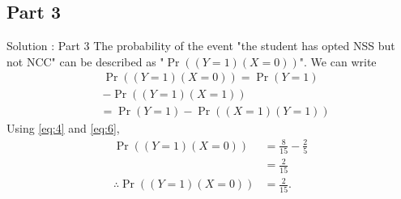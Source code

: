 \documentclass{beamer}
\providecommand{\pr}[1]{\ensuremath{\Pr\left(#1\right)}}
\providecommand{\brak}[1]{\ensuremath{\left(#1\right)}}
\begin{document}
\subsection{Part 3}

\begin{frame}{Solution : Part 3}
       The probability of the event "the student has opted NSS but not NCC" can be described as  "$ \pr{\brak{Y=1}\brak{ X = 0}}$". 
                We can write 
          \begin{equation}
             \begin{split}
                \pr{\brak{Y=1}\brak{ X = 0}} = \pr{Y = 1} \\
                                                  - \pr{\brak{Y = 1}\brak{X = 1}}
             \end{split}
          \end{equation}
          \begin{align}
                            &= \pr{Y = 1} -  \pr{\brak{X = 1}\brak{Y=1}}
          \end{align}
       Using \eqref{eq:4} and \eqref{eq:6},
          \begin{align}
	        \pr{\brak{Y=1}\brak{ X = 0}}  &= \frac{8}{15} -  \frac{2}{5}\\
                                              & = \frac{2}{15}\\
                \therefore  \pr{\brak{Y=1}\brak{ X = 0}} &= \frac{2}{15}.
          \end{align}
\end{frame}
\end{document}

